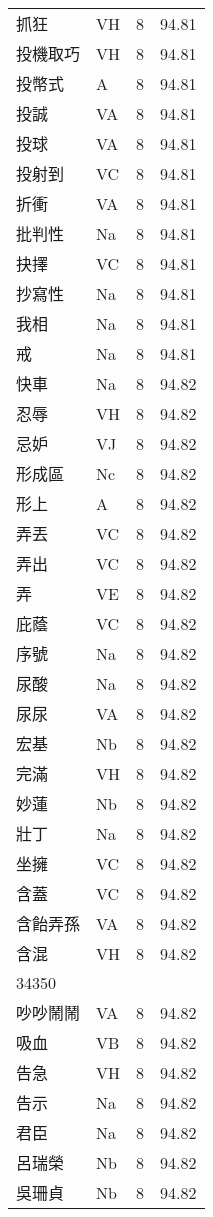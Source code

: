 \documentclass[twocolumn]{book}
\begin{document}
\begin{supertabular}{llrr}
抓狂 & VH & 8 &  94.81\\
投機取巧 & VH & 8 &  94.81\\
投幣式 & A & 8 &  94.81\\
投誠 & VA & 8 &  94.81\\
投球 & VA & 8 &  94.81\\
投射到 & VC & 8 &  94.81\\
折衝 & VA & 8 &  94.81\\
批判性 & Na & 8 &  94.81\\
抉擇 & VC & 8 &  94.81\\
抄寫性 & Na & 8 &  94.81\\
我相 & Na & 8 &  94.81\\
戒 & Na & 8 &  94.81\\
快車 & Na & 8 &  94.82\\
忍辱 & VH & 8 &  94.82\\
忌妒 & VJ & 8 &  94.82\\
形成區 & Nc & 8 &  94.82\\
形上 & A & 8 &  94.82\\
弄丟 & VC & 8 &  94.82\\
弄出 & VC & 8 &  94.82\\
弄 & VE & 8 &  94.82\\
庇蔭 & VC & 8 &  94.82\\
序號 & Na & 8 &  94.82\\
尿酸 & Na & 8 &  94.82\\
尿尿 & VA & 8 &  94.82\\
宏基 & Nb & 8 &  94.82\\
完滿 & VH & 8 &  94.82\\
妙蓮 & Nb & 8 &  94.82\\
壯丁 & Na & 8 &  94.82\\
坐擁 & VC & 8 &  94.82\\
含蓋 & VC & 8 &  94.82\\
含飴弄孫 & VA & 8 &  94.82\\
含混 & VH & 8 &  94.82\\
34350\\
吵吵鬧鬧 & VA & 8 &  94.82\\
吸血 & VB & 8 &  94.82\\
告急 & VH & 8 &  94.82\\
告示 & Na & 8 &  94.82\\
君臣 & Na & 8 &  94.82\\
呂瑞榮 & Nb & 8 &  94.82\\
吳珊貞 & Nb & 8 &  94.82\\

\end{supertabular}
\end{document}
